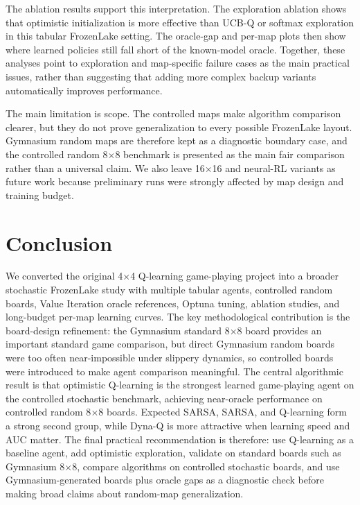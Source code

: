 \documentclass[10pt]{article}
\begin{document}
The ablation results support this interpretation. The exploration ablation shows that optimistic initialization is more effective than UCB-Q or softmax exploration in this tabular FrozenLake setting. The oracle-gap and per-map plots then show where learned policies still fall short of the known-model oracle. Together, these analyses point to exploration and map-specific failure cases as the main practical issues, rather than suggesting that adding more complex backup variants automatically improves performance.

The main limitation is scope. The controlled maps make algorithm comparison clearer, but they do not prove generalization to every possible FrozenLake layout. Gymnasium random maps are therefore kept as a diagnostic boundary case, and the controlled random 8$\times$8 benchmark is presented as the main fair comparison rather than a universal claim. We also leave 16$\times$16 and neural-RL variants as future work because preliminary runs were strongly affected by map design and training budget.

\section{Conclusion}
We converted the original 4$\times$4 Q-learning game-playing project into a broader stochastic FrozenLake study with multiple tabular agents, controlled random boards, Value Iteration oracle references, Optuna tuning, ablation studies, and long-budget per-map learning curves. The key methodological contribution is the board-design refinement: the Gymnasium standard 8$\times$8 board provides an important standard game comparison, but direct Gymnasium random boards were too often near-impossible under slippery dynamics, so controlled boards were introduced to make agent comparison meaningful. The central algorithmic result is that optimistic Q-learning is the strongest learned game-playing agent on the controlled stochastic benchmark, achieving near-oracle performance on controlled random 8$\times$8 boards. Expected SARSA, SARSA, and Q-learning form a strong second group, while Dyna-Q is more attractive when learning speed and AUC matter. The final practical recommendation is therefore: use Q-learning as a baseline agent, add optimistic exploration, validate on standard boards such as Gymnasium 8$\times$8, compare algorithms on controlled stochastic boards, and use Gymnasium-generated boards plus oracle gaps as a diagnostic check before making broad claims about random-map generalization.



\end{document}
